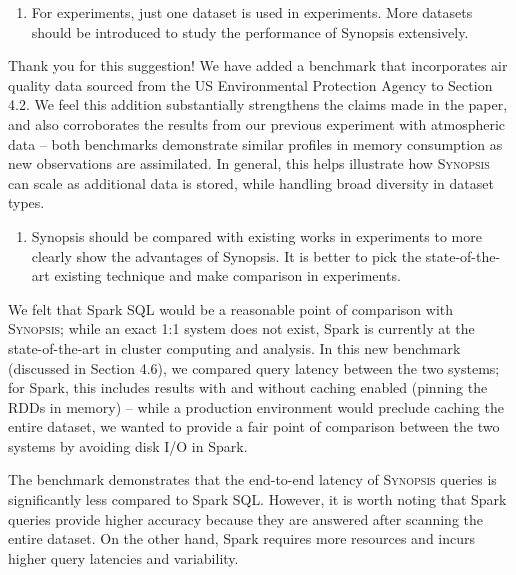\documentclass{article}
\begin{document}
\begin{enumerate}
\def\labelenumi{\arabic{enumi})}
\setcounter{enumi}{2}
\item
  For experiments, just one dataset is used in experiments. More
  datasets should be introduced to study the performance of Synopsis
  extensively.
\end{enumerate}

\begin{tcolorbox}
    Thank you for this suggestion! We have added a benchmark that incorporates air quality data sourced from the US Environmental Protection Agency to Section 4.2. We feel this addition substantially strengthens the claims made in the paper, and also corroborates the results from our previous experiment with atmospheric data -- both benchmarks demonstrate similar profiles in memory consumption as new observations are assimilated. In general, this helps illustrate how \textsc{Synopsis} can scale as additional data is stored, while handling broad diversity in dataset types.
\end{tcolorbox}

\begin{enumerate}
\def\labelenumi{\arabic{enumi})}
\setcounter{enumi}{3}
\item
  Synopsis should be compared with existing works in experiments to more
  clearly show the advantages of Synopsis. It is better to pick the
  state-of-the-art existing technique and make comparison in
  experiments.
\end{enumerate}

\begin{tcolorbox}
    We felt that Spark SQL would be a reasonable point of comparison with \textsc{Synopsis}; while an exact 1:1 system does not exist, Spark is currently at the state-of-the-art in cluster computing and analysis. In this new benchmark (discussed in Section 4.6), we compared query latency between the two systems; for Spark, this includes results with and without caching enabled (pinning the RDDs in memory) -- while a production environment would preclude caching the entire dataset, we wanted to provide a fair point of comparison between the two systems by avoiding disk I/O in Spark.
    
    The benchmark demonstrates that the end-to-end latency of \textsc{Synopsis} queries is significantly less compared to Spark SQL. However, it is worth noting that Spark queries provide higher accuracy because they are answered after scanning the entire dataset. On the other hand, Spark requires more resources and incurs higher query latencies and variability.
\end{tcolorbox}
\end{document}

